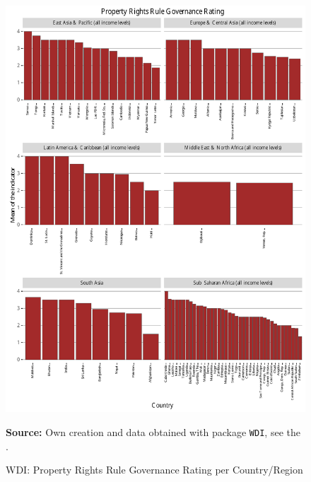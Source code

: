 \begin{figure}[H]
\begin{center}
\caption{WDI: Property Rights Rule Governance Rating per Country/Region}
\label{fig_wdi_prop}
\includegraphics[height=.9\textheight]{../img/wdi_property_rights_rule_governance_rating.pdf}
\end{center}
\noindent \footnotesize{\textbf{Source:} Own creation and data obtained with package \texttt{WDI}, see the \cite{wb_r}.}
\end{figure}

